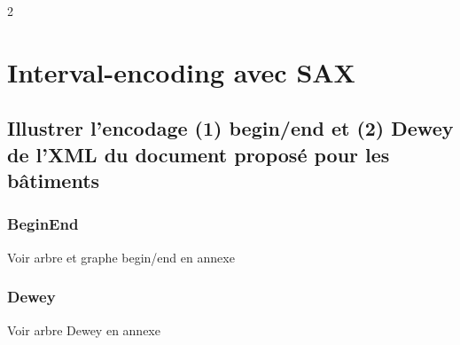 2\chapter{Interval-encoding avec SAX}
\section{Illustrer l’encodage (1) begin/end et (2) Dewey de l’XML du document proposé pour les bâtiments}
\subsection{BeginEnd}
Voir arbre et graphe begin/end en annexe

\subsection{Dewey}
Voir arbre Dewey en annexe

